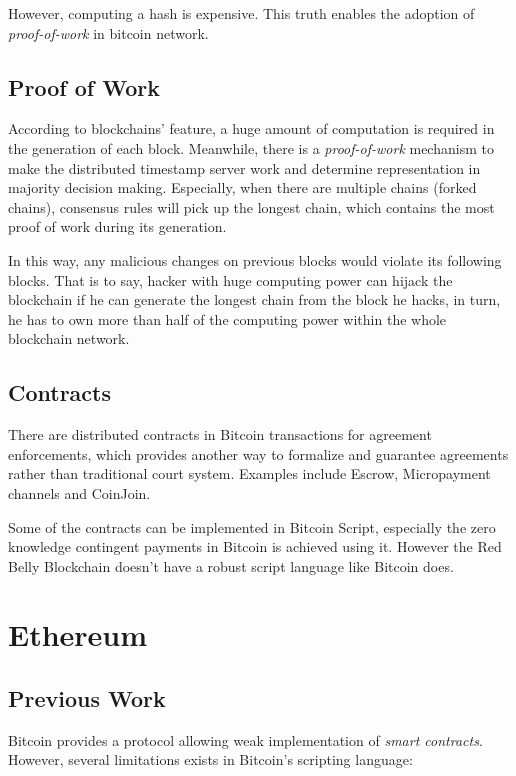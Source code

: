 \documentclass[12pt]{article}
\begin{document}
However, computing a hash is expensive. This truth enables the adoption of \textit{proof-of-work} in bitcoin network. 

\subsection{Proof of Work}

According to blockchains' feature, a huge amount of computation is required in the generation of each block. Meanwhile, there is a \textit{proof-of-work} mechanism to make the distributed timestamp server work and determine representation in majority decision making. Especially, when there are multiple chains (forked chains), consensus rules will pick up the longest chain, which contains the most proof of work during its generation\cite{nakamoto2008bitcoin}.

In this way, any malicious changes on previous blocks would violate its following blocks. That is to say, hacker with huge computing power can hijack the blockchain if he can generate the longest chain from the block he hacks, in turn, he has to own more than half of the computing power within the whole blockchain network\cite{NG17}.

\subsection{Contracts}

There are distributed contracts in Bitcoin transactions for agreement enforcements, which provides another way to formalize and guarantee agreements rather than traditional court system. Examples include Escrow, Micropayment channels and CoinJoin.

Some of the contracts can be implemented in Bitcoin Script, especially the zero knowledge contingent payments in Bitcoin is achieved using it. However the Red Belly Blockchain doesn't have a robust script language like Bitcoin does.

\section{Ethereum}

\subsection{Previous Work}

Bitcoin provides a protocol allowing weak implementation of \textit{smart contracts}. However, several limitations exists in Bitcoin's scripting language:
\end{document}
